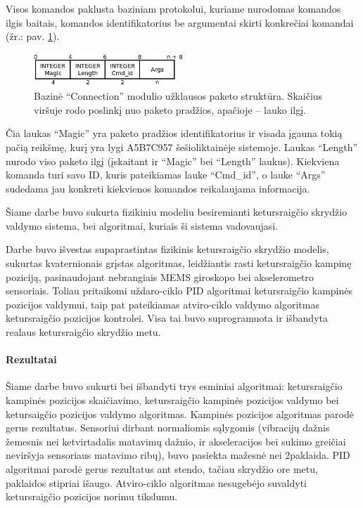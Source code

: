 \documentclass[12pt, a4paper, lithuanian, final]{article}
\begin{document}
Visos komandos paklusta baziniam protokolui, kuriame nurodomas komandos ilgis baitais, komandos identifikatorius be argumentai skirti konkrečiai komandai (žr.: pav. \ref{pav-cmd-proto}).

\begin{figure}[H]
\begin{center}
\includegraphics[width=0.5\textwidth]{img/basePacket.png}
\caption{Bazinė "`Connection"' modulio užklausos paketo struktūra. Skaičius viršuje rodo poslinkį nuo paketo pradžios, apačioje -- lauko ilgį.}
\label{pav-cmd-proto}
\end{center}
\end{figure}

Čia laukas "`Magic"' yra paketo pradžios identifikatorius ir visada įgauna tokią pačią reikšmę, kurį yra lygi A5B7C957 šešioliktainėje sistemoje.
Laukas "`Length"' nurodo viso paketo ilgį (įskaitant ir "`Magic"' bei "`Length"' laukus). Kiekviena komanda turi savo ID, kuris pateikiamas lauke "`Cmd\_id"', o lauke "`Args"' sudedama jau konkreti kiekvienos komandos reikalaujama informacija.







Šiame darbe buvo sukurta fizikiniu modeliu besiremianti ketursraigčio skrydžio valdymo sistema, bei algoritmai, kuriais ši sistema vadovaujasi.


Darbe buvo išvestas supaprastintas fizikinis ketursraigčio skrydžio modelis, sukurtas kvaternionais grįstas algoritmas, leidžiantis rasti ketursraigčio kampinę poziciją, pasinaudojant nebrangiais MEMS giroskopo bei akselerometro sensoriais.
Toliau pritaikomi uždaro-ciklo PID algoritmai ketursraigčio kampinės pozicijos valdymui, taip pat pateikiamas atviro-ciklo valdymo algoritmas ketursraigčio pozicijos kontrolei.
Visa tai buvo suprogramuota ir išbandyta realaus ketursraigčio skrydžio metu.


\paragraph{Rezultatai}

Šiame darbe buvo sukurti bei išbandyti trys esminiai algoritmai: ketursraigčio kampinės pozicijos skaičiavimo, ketursraigčio kampinės pozicijos valdymo bei ketursaigčio pozicijos valdymo algoritmas.
Kampinės pozicijos algoritmas parodė gerus rezultatus.
Sensoriui dirbant normaliomis sąlygomis (vibracijų dažnis žemesnis nei ketvirtadalis matavimų dažnio, ir akseleracijos bei sukimo greičiai neviršyja sensoriaus matavimo ribų), buvo pasiekta mažesnė nei 2\degree paklaida.
PID algoritmai parodė gerus rezultatus ant stendo, tačiau skrydžio ore metu, paklaidos stipriai išaugo.
Atviro-ciklo algoritmas nesugebėjo suvaldyti ketursraigčio pozicijos norimu tikslumu.
\end{document}
